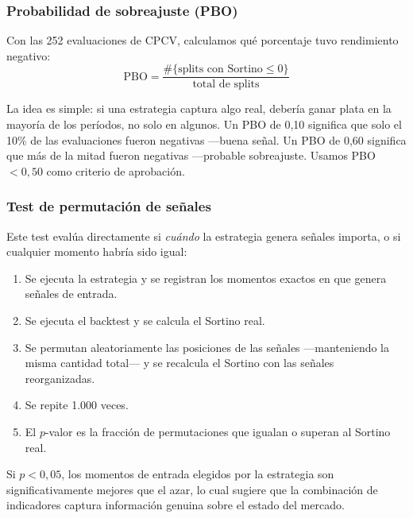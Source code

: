\documentclass[12pt,a4paper]{article}
\begin{document}
\subsubsection{Probabilidad de sobreajuste (PBO)}

Con las 252 evaluaciones de CPCV, calculamos qué porcentaje tuvo rendimiento
negativo:
\begin{equation}
\text{PBO} = \frac{\#\{\text{splits con Sortino} \leq 0\}}{\text{total de splits}}
\label{eq:pbo}
\end{equation}

La idea es simple: si una estrategia captura algo real, debería ganar plata en la
mayoría de los períodos, no solo en algunos. Un PBO de 0,10 significa que solo el
10\% de las evaluaciones fueron negativas ---buena señal. Un PBO de 0,60 significa
que más de la mitad fueron negativas ---probable sobreajuste. Usamos PBO $< 0{,}50$
como criterio de aprobación.

\subsubsection{Test de permutación de señales}

Este test evalúa directamente si \textit{cuándo} la estrategia genera señales
importa, o si cualquier momento habría sido igual:
\begin{enumerate}
\item Se ejecuta la estrategia y se registran los momentos exactos en que genera
  señales de entrada.
\item Se ejecuta el backtest y se calcula el Sortino real.
\item Se permutan aleatoriamente las posiciones de las señales ---manteniendo la
  misma cantidad total--- y se recalcula el Sortino con las señales reorganizadas.
\item Se repite 1.000 veces.
\item El $p$-valor es la fracción de permutaciones que igualan o superan al Sortino
  real.
\end{enumerate}

Si $p < 0{,}05$, los momentos de entrada elegidos por la estrategia son
significativamente mejores que el azar, lo cual sugiere que la combinación de
indicadores captura información genuina sobre el estado del mercado.

\end{document}
